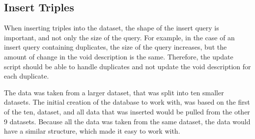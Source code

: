 

\subsection{Insert Triples}\label{sec:insert-triples}
When inserting triples into the dataset, the shape of the insert query is important, and not only the size of the query. For example, in the case of an insert query containing duplicates, the size of the query increases, but the amount of change in the \gls{void} description is the same. Therefore, the update script should be able to handle duplicates and not update the \gls{void} description for each duplicate.


The data was taken from a larger dataset, that was split into ten smaller datasets. The initial creation of the database to work with, was based on the first of the ten, dataset, and all data that was inserted would be pulled from the other 9 datasets. Because all the data was taken from the same dataset, the data would have a similar structure, which made it easy to work with.


